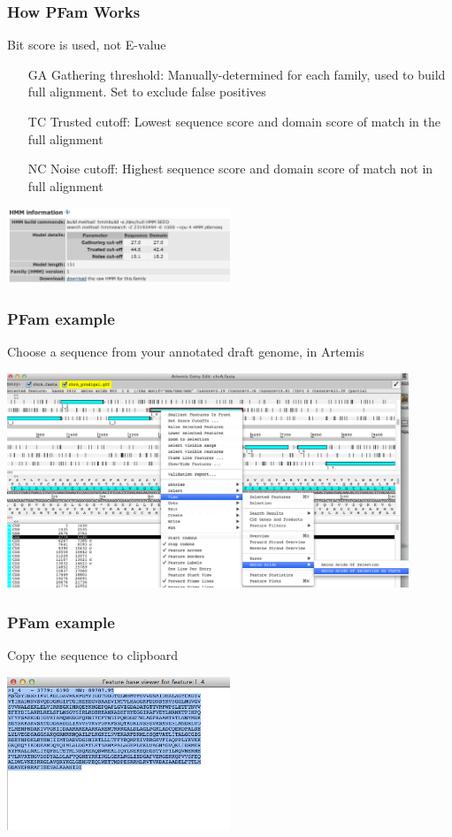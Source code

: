     \begin{frame}
      \frametitle{How PFam Works}  
      Bit score is used, not E-value
      \begin{itemize}
        \item [GA] Gathering threshold: Manually-determined for each family, used to build full alignment. Set to exclude false positives 
        \item [TC] Trusted cutoff: Lowest sequence score and domain score of match in the full alignment
        \item [NC] Noise cutoff: Highest sequence score and domain score of match not in full alignment
      \end{itemize}
      \begin{center}
        \includegraphics[width=0.5\textwidth]{images/pfam4} 
      \end{center}      
    \end{frame}

    \begin{frame}
      \frametitle{PFam example}  
      Choose a sequence from your annotated draft genome, in Artemis \\
      \begin{center}
        \includegraphics[width=0.9\textwidth]{images/pfam5} 
      \end{center}      
    \end{frame}

    \begin{frame}
      \frametitle{PFam example}  
      Copy the sequence to clipboard
      \begin{center}
        \includegraphics[width=0.5\textwidth]{images/pfam6} 
      \end{center}      
    \end{frame}

